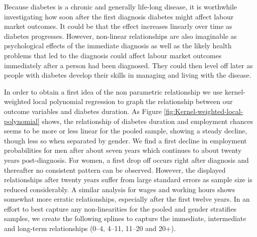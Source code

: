 Because diabetes is a chronic and generally life-long disease, it
is worthwhile investigating how soon after the first diagnosis diabetes
might affect labour market outcomes. It could be that the effect increases
linearly over time as diabetes progresses. However, non-linear relationships
are also imaginable as psychological effects of the immediate diagnosis
as well as the likely health problems that led to the diagnosis could
affect labour market outcomes immediately after a person had been
diagnosed. They could then level off later as people with diabetes
develop their skills in managing and living with the disease.

In order to obtain a first idea of the non parametric relationship
we use kernel-weighted local polynomial regression to graph the relationship
between our outcome variables and diabetes duration. As Figure \ref{fig:Kernel-weighted-local-polynomial}
shows, the relationship of diabetes duration and employment chances
seems to be more or less linear for the pooled sample, showing a steady
decline, though less so when separated by gender. We find a first
decline in employment probabilities for men after about seven years
which continues to about twenty years post-diagnosis. For women,
a first drop off occurs right after diagnosis and thereafter no consistent
pattern can be observed. However, the displayed relationships after
twenty years suffer from large standard errors as sample size is reduced
considerably. A similar analysis for wages and working hours shows
somewhat more erratic relationships, especially after the first twelve
years. In an effort to best capture any non-linearities for the pooled
and gender stratifies samples, we create the following splines to
capture the immediate, intermediate and long-term relationships (0--4,
4--11, 11--20 and 20+).   
  
  
  
  
  
  
  
  
  
  
  
  
  
  
  